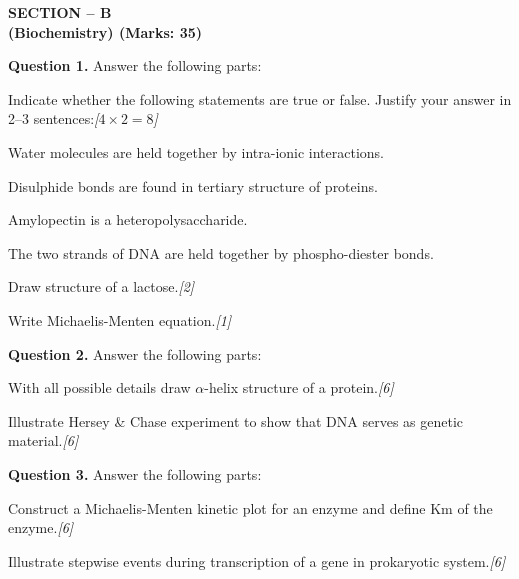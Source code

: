 \documentclass[11pt,a4paper]{article}
\newcommand{\pts}[1]{\hfill   \textit{[#1]}}
\begin{document}
\pagebreak

\begin{center}
   \textbf{SECTION -- B} \\
   \textbf{(Biochemistry) (Marks: 35)}
\end{center}

\medskip


\noindent   \textbf{Question 1.} Answer the following parts:

\begin{parts}
  \item Indicate whether the following statements are true or false. Justify your answer in 2--3 sentences:\pts{$4  \times 2 = 8$}
  
\begin{parts}
    \item Water molecules are held together by intra-ionic interactions.
    \item Disulphide bonds are found in tertiary structure of proteins.
    \item Amylopectin is a heteropolysaccharide.
    \item The two strands of DNA are held together by phospho-diester bonds.
  \end{parts}

  \item Draw structure of a lactose.\pts{2}

  \item Write Michaelis-Menten equation.\pts{1}
\end{parts}

\medskip


\noindent   \textbf{Question 2.} Answer the following parts:

\begin{parts}
  \item With all possible details draw $\alpha$-helix structure of a protein.\pts{6}
  \item Illustrate Hersey \& Chase experiment to show that DNA serves as genetic material.\pts{6}
\end{parts}

\medskip


\noindent   \textbf{Question 3.} Answer the following parts:

\begin{parts}
  \item Construct a Michaelis-Menten kinetic plot for an enzyme and define Km of the enzyme.\pts{6}
  \item Illustrate stepwise events during transcription of a gene in prokaryotic system.\pts{6}
\end{parts}
\end{document}
